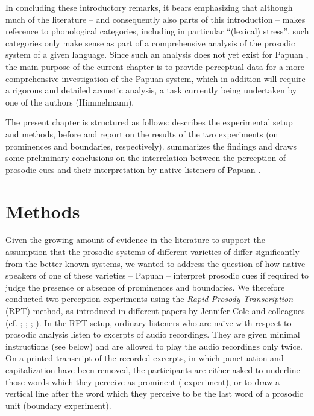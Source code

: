 \documentclass[output=paper
,modfonts
,nonflat]{langsci/langscibook}
\begin{document}
In concluding these introductory remarks, it bears emphasizing that although much of the literature – and consequently also parts of this introduction – makes reference to phonological categories, including in particular “(lexical) stress”, such categories only make sense as part of a comprehensive analysis of the prosodic system of a given language. Since such an analysis does not yet exist for Papuan , the main purpose of the current chapter is to provide perceptual data for a more comprehensive investigation of the Papuan  system, which in addition will require a rigorous and detailed acoustic analysis, a task currently being undertaken by one of the authors (Himmelmann).

The present chapter is structured as follows:  describes the experimental setup and methods, before  and  report on the results of the two experiments (on prominences and boundaries, respectively).  summarizes the findings and draws some preliminary conclusions on the interrelation between the perception of prosodic cues and their interpretation by native listeners of Papuan .

\section{\label{s:riesberg:2}Methods}

Given the growing amount of evidence in the literature to support the assumption that the prosodic systems of different varieties of  differ significantly from the better-known  systems, we wanted to address the question of how native speakers of one of these varieties – Papuan  – interpret prosodic cues if required to judge the presence or absence of prominences and boundaries. We therefore conducted two perception experiments using the \textit{Rapid Prosody Transcription} (RPT) method, as introduced in different papers by Jennifer Cole and colleagues (cf. \citealt{Mo2008}; \citealt{Cole2010a}; \citealt{Cole2010b}; \citealt[7--13]{Cole2016}). In the RPT setup, ordinary listeners who are naïve with respect to prosodic analysis listen to excerpts of audio recordings. They are given minimal instructions (see below) and are allowed to play the audio recordings only twice. On a printed transcript of the recorded excerpts, in which punctuation and capitalization have been removed, the participants are either asked to underline those words which they perceive as prominent ( experiment), or to draw a vertical line after the word which they perceive to be the last word of a prosodic unit (boundary experiment). 
\end{document}
